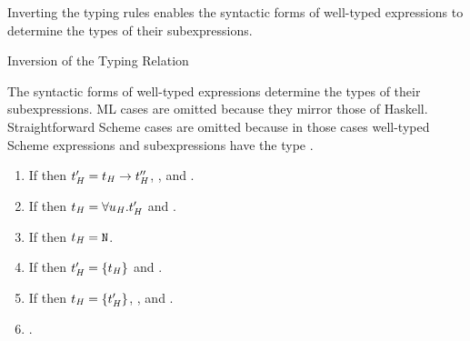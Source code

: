Inverting the typing rules enables the syntactic forms of well-typed expressions to determine the types of their subexpressions.

\begin{lemma}{Inversion of the Typing Relation}

\label{leminv}

The syntactic forms of well-typed expressions determine the types of their subexpressions.  ML cases are omitted because they mirror those of Haskell.  Straightforward Scheme cases are omitted because in those cases well-typed Scheme expressions and subexpressions have the type \tytst.

\begin{enumerate}



\item If \judeh{\env}{\expfabss{\varvarh}{\first{\vartyh}}{\varexph}}{\second{\vartyh}} then $t_{\mathit{H}}' = t_{\mathit{H}} \rightarrow t_{\mathit{H}}''$, \judth{\env}{\first{\vartyh}}, and \judeh{\envexte{\env}{\varvarh}{\first{\vartyh}}}{\varexph}{\third{\vartyh}}.


\item If \judeh{\env}{\exptabs{\tyvarh}{\varexph}}{\first{\vartyh}} then $t_{\mathit{H}} = \forall u_{\mathit{H}} . t_{\mathit{H}}'$ and \judeh{\envextt{\env}{\tyvarh}}{\varexph}{\second{\vartyh}}.


\item If \judeh{}{\expnum{\symnum}}{\vartyh} then $t_{\mathit{H}} = \mathtt{N}$.


\item If \judeh{\env}{\expnils{\first{\vartyh}}}{\second{\vartyh}} then $t_{\mathit{H}}' = \lbrace t_{\mathit{H}} \rbrace$ and \judth{\env}{\first{\vartyh}}.


\item If \judeh{\env}{\expcons{\first{\varexph}}{\second{\varexph}}}{\first{\vartyh}} then $t_{\mathit{H}} = \lbrace t_{\mathit{H}}' \rbrace$, \judeh{\env}{\first{\varexph}}{\second{\vartyh}}, and \judeh{\env}{\second{\varexph}}{\tylist{\second{\vartyh}}}.


\item \judeh{\envexte{\env}{\varvarh}{\vartyh}}{\varvarh}{\vartyh}.


\end{enumerate}
\end{lemma}
